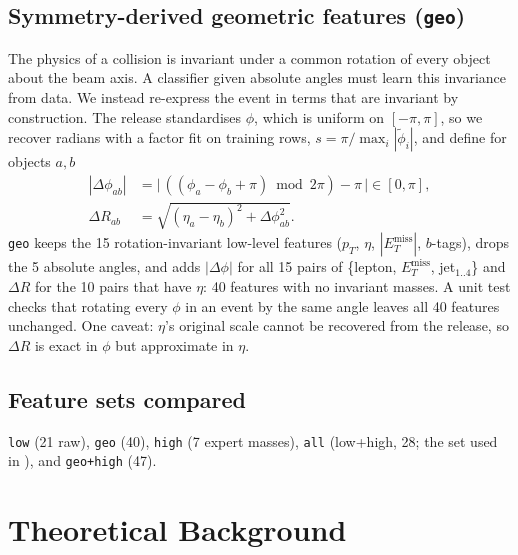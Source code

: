 \documentclass[conference]{IEEEtran}
\begin{document}
\subsection{Symmetry-derived geometric features (\texttt{geo})}
The physics of a collision is invariant under a common rotation of every object about the beam axis.
A classifier given absolute angles must learn this invariance from data. We instead re-express
the event in terms that are invariant by construction. The release standardises $\phi$, which is
uniform on $[-\pi,\pi]$, so we recover radians with a factor fit on training rows,
$s=\pi/\max_i|\tilde\phi_i|$, and define for objects $a,b$
\begin{align}
|\Delta\phi_{ab}| &= \bigl|\,((\phi_a-\phi_b+\pi)\bmod 2\pi)-\pi\,\bigr| \in [0,\pi],\\
\Delta R_{ab} &= \sqrt{(\eta_a-\eta_b)^2+\Delta\phi_{ab}^2}.
\end{align}
\texttt{geo} keeps the 15 rotation-invariant low-level features ($p_T$, $\eta$, $|E_T^\mathrm{miss}|$,
$b$-tags), drops the 5 absolute angles, and adds $|\Delta\phi|$ for all 15 pairs of
\{lepton, $E_T^\mathrm{miss}$, jet$_{1..4}$\} and $\Delta R$ for the 10 pairs that have $\eta$:
40 features with no invariant masses. A unit test checks that rotating every $\phi$ in an event by
the same angle leaves all 40 features unchanged. One caveat: $\eta$'s original scale cannot be
recovered from the release, so $\Delta R$ is exact in $\phi$ but approximate in $\eta$.

\subsection{Feature sets compared}
\texttt{low} (21 raw), \texttt{geo} (40), \texttt{high} (7 expert masses), \texttt{all}
(low+high, 28; the set used in \cite{baldi2014searching}), and \texttt{geo+high} (47).

\section{Theoretical Background}\label{sec:theory}
\end{document}
